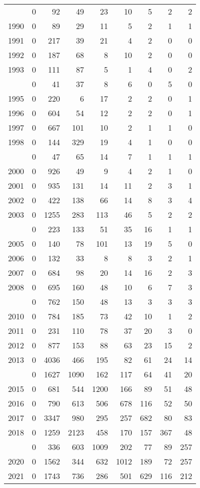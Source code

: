 \documentclass[
]{article}
\begin{document}
\begin{longtable}[t]{lrrrrrrrr}
\endfoot
\bottomrule
\endlastfoot
1989 & 0 & 92 & 49 & 23 & 10 & 5 & 2 & 2\\
1990 & 0 & 89 & 29 & 11 & 5 & 2 & 1 & 1\\
1991 & 0 & 217 & 39 & 21 & 4 & 2 & 0 & 0\\
1992 & 0 & 187 & 68 & 8 & 10 & 2 & 0 & 0\\
1993 & 0 & 111 & 87 & 5 & 1 & 4 & 0 & 2\\
\addlinespace
1994 & 0 & 41 & 37 & 8 & 6 & 0 & 5 & 0\\
1995 & 0 & 220 & 6 & 17 & 2 & 2 & 0 & 1\\
1996 & 0 & 604 & 54 & 12 & 2 & 2 & 0 & 1\\
1997 & 0 & 667 & 101 & 10 & 2 & 1 & 1 & 0\\
1998 & 0 & 144 & 329 & 19 & 4 & 1 & 0 & 0\\
\addlinespace
1999 & 0 & 47 & 65 & 14 & 7 & 1 & 1 & 1\\
2000 & 0 & 926 & 49 & 9 & 4 & 2 & 1 & 0\\
2001 & 0 & 935 & 131 & 14 & 11 & 2 & 3 & 1\\
2002 & 0 & 422 & 138 & 66 & 14 & 8 & 3 & 4\\
2003 & 0 & 1255 & 283 & 113 & 46 & 5 & 2 & 2\\
\addlinespace
2004 & 0 & 223 & 133 & 51 & 35 & 16 & 1 & 1\\
2005 & 0 & 140 & 78 & 101 & 13 & 19 & 5 & 0\\
2006 & 0 & 132 & 33 & 8 & 8 & 3 & 2 & 1\\
2007 & 0 & 684 & 98 & 20 & 14 & 16 & 2 & 3\\
2008 & 0 & 695 & 160 & 48 & 10 & 6 & 7 & 3\\
\addlinespace
2009 & 0 & 762 & 150 & 48 & 13 & 3 & 3 & 3\\
2010 & 0 & 784 & 185 & 73 & 42 & 10 & 1 & 2\\
2011 & 0 & 231 & 110 & 78 & 37 & 20 & 3 & 0\\
2012 & 0 & 877 & 153 & 88 & 63 & 23 & 15 & 2\\
2013 & 0 & 4036 & 466 & 195 & 82 & 61 & 24 & 14\\
\addlinespace
2014 & 0 & 1627 & 1090 & 162 & 117 & 64 & 41 & 20\\
2015 & 0 & 681 & 544 & 1200 & 166 & 89 & 51 & 48\\
2016 & 0 & 790 & 613 & 506 & 678 & 116 & 52 & 50\\
2017 & 0 & 3347 & 980 & 295 & 257 & 682 & 80 & 83\\
2018 & 0 & 1259 & 2123 & 458 & 170 & 157 & 367 & 48\\
\addlinespace
2019 & 0 & 336 & 603 & 1009 & 202 & 77 & 89 & 257\\
2020 & 0 & 1562 & 344 & 632 & 1012 & 189 & 72 & 257\\
2021 & 0 & 1743 & 736 & 286 & 501 & 629 & 116 & 212\\*
\end{longtable}
\end{document}
